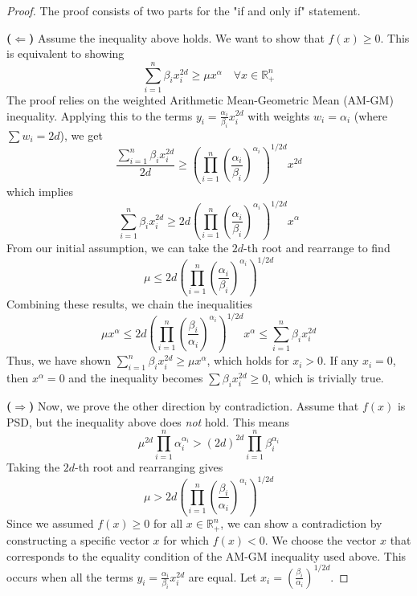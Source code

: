 \documentclass{article}
\begin{document}
\begin{proof}
The proof consists of two parts for the "if and only if" statement.

	\textbf{(\(\Leftarrow\))} Assume the inequality above holds. We want to show that $f(x) \geq 0$. This is equivalent to showing
\[
   \sum_{i=1}^n \beta_i x_i^{2d} \geq \mu x^{\alpha} \quad \forall x \in \mathbb{R}_+^n
\]
The proof relies on the weighted Arithmetic Mean-Geometric Mean (AM-GM) inequality. Applying this to the terms 
$y_i = \frac{\alpha_i}{\beta_i} x_i^{2d}$ with weights $w_i = \alpha_i$ (where $\sum w_i = 2d$), we get
\[
   \frac{\sum_{i=1}^n \beta_i x_i^{2d}}{2d} \geq \left( \prod_{i=1}^n \left( \frac{\alpha_i}{\beta_i} \right)^{\alpha_i} \right)^{1/2d} x^{2d}
\]
which implies
\[
   \sum_{i=1}^n \beta_i x_i^{2d} \geq 2d \left( \prod_{i=1}^n \left( \frac{\alpha_i}{\beta_i} \right)^{\alpha_i} \right)^{1/2d} x^{\alpha}
\]
From our initial assumption, we can take the $2d$-th root and rearrange to find
\[
   \mu \leq 2d \left( \prod_{i=1}^n \left( \frac{\alpha_i}{\beta_i} \right)^{\alpha_i} \right)^{1/2d}
\]
Combining these results, we chain the inequalities
\[
   \mu x^{\alpha} \leq 2d \left( \prod_{i=1}^n \left( \frac{\beta_i}{\alpha_i} \right)^{\alpha_i} \right)^{1/2d} x^{\alpha} \leq \sum_{i=1}^n \beta_i x_i^{2d}
\]
Thus, we have shown $\sum_{i=1}^n \beta_i x_i^{2d} \geq \mu x^{\alpha}$, which holds for $x_i > 0$. If any $x_i = 0$, 
then $x^{\alpha} = 0$ and the inequality becomes $\sum \beta_i x_i^{2d} \geq 0$, which is trivially true.

	\textbf{(\(\Rightarrow\))} Now, we prove the other direction by contradiction. Assume that $f(x)$ is PSD, but the 
   inequality above does \emph{not} hold. This means
\[
   \mu^{2d} \prod_{i=1}^n \alpha_i^{\alpha_i} > (2d)^{2d} \prod_{i=1}^n \beta_i^{\alpha_i}
\]
Taking the $2d$-th root and rearranging gives
\[
   \mu > 2d \left( \prod_{i=1}^n \left( \frac{\beta_i}{\alpha_i} \right)^{\alpha_i} \right)^{1/2d}
\]
Since we assumed $f(x) \geq 0$ for all $x \in \mathbb{R}_+^n$, we can show a contradiction by constructing a specific 
vector $x$ for which $f(x) < 0$. We choose the vector $x$ that corresponds to the equality condition of the AM-GM inequality 
used above. This occurs when all the terms $y_i = \frac{\alpha_i}{\beta_i} x_i^{2d}$ are equal. 
Let $x_i = \left( \frac{\beta_i}{\alpha_i} \right)^{1/2d}$.


\end{proof}
\end{document}
